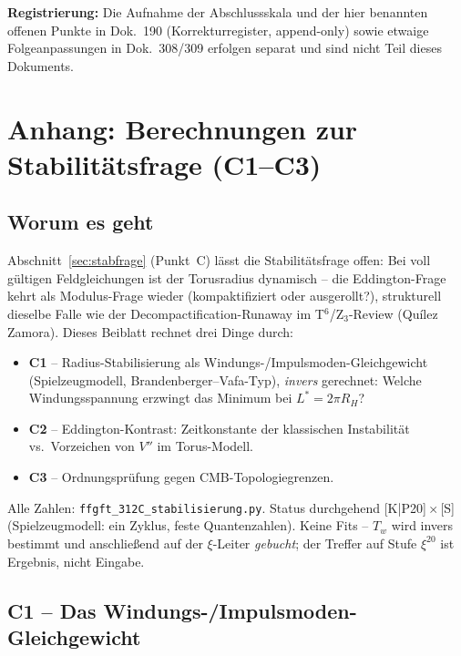 \documentclass[11pt]{report}
\begin{document}
\medskip
\noindent\textbf{Registrierung:} Die Aufnahme der Abschlussskala und
der hier benannten offenen Punkte in Dok.~190 (Korrekturregister,
append-only) sowie etwaige Folgeanpassungen in Dok.~308/309 erfolgen
separat und sind nicht Teil dieses Dokuments.


\appendix
\chapter{Anhang: Berechnungen zur Stabilitätsfrage (C1--C3)}
\label{app:stab}

\section*{Worum es geht}

Abschnitt~\ref{sec:stabfrage} (Punkt~C) lässt die Stabilitätsfrage offen: Bei
voll gültigen Feldgleichungen ist der Torusradius dynamisch -- die
Eddington-Frage kehrt als Modulus-Frage wieder (kompaktifiziert oder
ausgerollt?), strukturell dieselbe Falle wie der
Decompactification-Runaway im T$^6$/Z$_3$-Review (Quílez Zamora).
Dieses Beiblatt rechnet drei Dinge durch:

\begin{itemize}
  \item \textbf{C1} -- Radius-Stabilisierung als
        Windungs-/Impulsmoden-Gleichgewicht (Spielzeugmodell,
        Brandenberger--Vafa-Typ), \emph{invers} gerechnet: Welche
        Windungsspannung erzwingt das Minimum bei $L^{*} = 2\pi R_H$?
  \item \textbf{C2} -- Eddington-Kontrast: Zeitkonstante der
        klassischen Instabilität vs.\ Vorzeichen von $V''$ im
        Torus-Modell.
  \item \textbf{C3} -- Ordnungsprüfung gegen CMB-Topologiegrenzen.
\end{itemize}

Alle Zahlen: \texttt{ffgft\_312C\_stabilisierung.py}. Status
durchgehend [K|P20]\,$\times$\,[S] (Spielzeugmodell: ein Zyklus,
feste Quantenzahlen). Keine Fits -- $T_w$ wird invers bestimmt und
anschließend auf der $\xi$-Leiter \emph{gebucht}; der Treffer auf
Stufe $\xi^{20}$ ist Ergebnis, nicht Eingabe.

\section{C1 -- Das Windungs-/Impulsmoden-Gleichgewicht}
\end{document}
